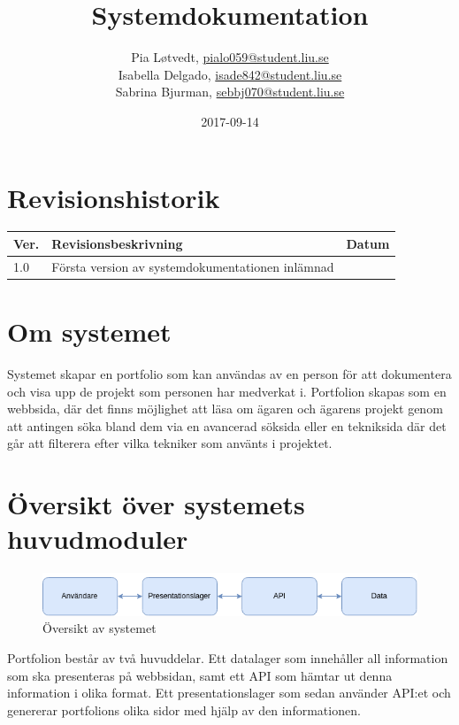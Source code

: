 \documentclass{TDP003mall}
\author{Pia Løtvedt, \url{pialo059@student.liu.se}\\
  Isabella Delgado, \url{isade842@student.liu.se}\\
Sabrina Bjurman, \url{sebbj070@student.liu.se}}
\title{Systemdokumentation}
\date{2017-09-14}
\begin{document}
\projectpage

\tableofcontents
\pagebreak



\section{Revisionshistorik}
\begin{table}[!h]
\renewcommand{\arraystretch}{1.5}
\begin{tabularx}{\linewidth}{|l|X|l|}
\hline
Ver. & Revisionsbeskrivning & Datum \\
\hline
1.0 & Första version av systemdokumentationen inlämnad &  \\
\hline
\end{tabularx}
\end{table}


\section{Om systemet}
Systemet skapar en portfolio som kan användas av en person för att dokumentera och visa upp de projekt som personen har medverkat i. Portfolion skapas som en webbsida, där det finns möjlighet att läsa om ägaren och ägarens projekt genom att antingen söka bland dem via en avancerad söksida eller en tekniksida där det går att filterera efter vilka tekniker som använts i projektet.

\pagebreak
\section{Översikt över systemets huvudmoduler}


\begin{figure}[h]
  \centering
  \includegraphics[scale=0.6]{overview}
  \caption{Översikt av systemet}

\end{figure}


Portfolion består av två huvuddelar. Ett datalager som innehåller all information som ska presenteras på webbsidan, samt ett API som hämtar ut denna information i olika format.
Ett presentationslager som sedan använder API:et och genererar portfolions olika sidor med hjälp av den informationen.
\end{document}

